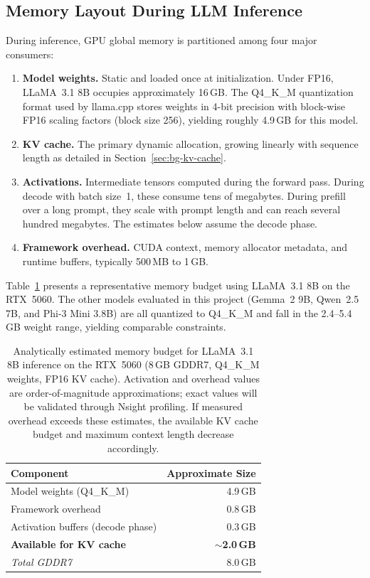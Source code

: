 \documentclass[
english,                 %
bibtex,                  %
]{kththesis}
\numberwithin{listing}{chapter}
\begin{document}
\subsection{Memory Layout During LLM Inference}
\label{sec:bg-memory-layout}

During inference, \gls{GPU} global memory is partitioned among four major consumers:

\begin{enumerate}
  \item \textbf{Model weights.} Static and loaded once at initialization. Under \gls{FP16}, LLaMA~3.1 8B occupies approximately 16\,GB. The Q4\_K\_M quantization format used by llama.cpp stores weights in 4-bit precision with block-wise \gls{FP16} scaling factors (block size 256), yielding roughly 4.9\,GB for this model.
  \item \textbf{\gls{KV} cache.} The primary dynamic allocation, growing linearly with sequence length as detailed in Section~\ref{sec:bg-kv-cache}.
  \item \textbf{Activations.} Intermediate tensors computed during the forward pass. During decode with batch size~1, these consume tens of megabytes. During prefill over a long prompt, they scale with prompt length and can reach several hundred megabytes. The estimates below assume the decode phase.
  \item \textbf{Framework overhead.} \gls{CUDA} context, memory allocator metadata, and runtime buffers, typically 500\,MB to 1\,GB.
\end{enumerate}

Table~\ref{tab:memory-budget} presents a representative memory budget using LLaMA~3.1 8B on the RTX~5060. The other models evaluated in this project (Gemma~2 9B, Qwen~2.5 7B, and Phi-3 Mini 3.8B) are all quantized to Q4\_K\_M and fall in the 2.4--5.4\,GB weight range, yielding comparable constraints.

\begin{table}[!ht]
  \centering
  \caption{Analytically estimated memory budget for LLaMA~3.1 8B inference on the RTX~5060 (8\,GB GDDR7, Q4\_K\_M weights, \gls{FP16} \gls{KV} cache). Activation and overhead values are order-of-magnitude approximations; exact values will be validated through Nsight profiling. If measured overhead exceeds these estimates, the available \gls{KV} cache budget and maximum context length decrease accordingly.}
  \label{tab:memory-budget}
  \begin{tabular}{l r}
    \toprule
    \textbf{Component} & \textbf{Approximate Size} \\
    \midrule
    Model weights (Q4\_K\_M)               & 4.9\,GB \\
    Framework overhead                      & 0.8\,GB \\
    Activation buffers (decode phase)       & 0.3\,GB \\
    \textbf{Available for KV cache}         & \textbf{$\sim$2.0\,GB} \\
    \midrule
    \textit{Total GDDR7}                    & 8.0\,GB \\
    \bottomrule
  \end{tabular}
\end{table}
\end{document}
